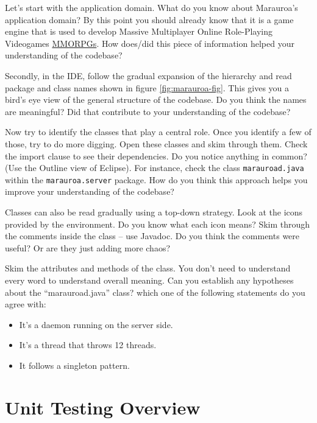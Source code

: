 \documentclass[
]{book}
\providecommand{\tightlist}{%
  \setlength{\itemsep}{0pt}\setlength{\parskip}{0pt}}
\begin{document}
Let's start with the application domain. What do you know about Marauroa's application domain? By this point you should already know that it is a game engine that is used to develop Massive Multiplayer Online Role-Playing Videogames \href{https://en.wikipedia.org/wiki/Massively_multiplayer_online_role-playing_game}{MMORPGs}. How does/did this piece of information helped your understanding of the codebase?

Secondly, in the IDE, follow the gradual expansion of the hierarchy and read package and class names shown in figure \ref{fig:marauroa-fig}. This gives you a bird's eye view of the general structure of the codebase. Do you think the names are meaningful? Did that contribute to your understanding of the codebase?

Now try to identify the classes that play a central role. Once you identify a few of those, try to do more digging. Open these classes and skim through them. Check the import clause to see their dependencies. Do you notice anything in common? (Use the Outline view of Eclipse). For instance, check the class \texttt{marauroad.java} within the \texttt{marauroa.server} package. How do you think this approach helps you improve your understanding of the codebase?

Classes can also be read gradually using a top-down strategy. Look at the icons provided by the environment. Do you know what each icon means? Skim through the comments inside the class -- use Javadoc. Do you think the comments were useful? Or are they just adding more chaos?

Skim the attributes and methods of the class. You don't need to understand every word to understand overall meaning. Can you establish any hypotheses about the ``marauroad.java'' class? which one of the following statements do you agree with:

\begin{itemize}
\tightlist
\item
  It's a daemon running on the server side.
\item
  It's a thread that throws 12 threads.
\item
  It follows a singleton pattern.
\end{itemize}

\hypertarget{unit-testing-overview}{%
\section{Unit Testing Overview}\label{unit-testing-overview}}
\end{document}

